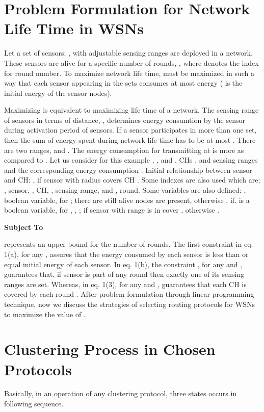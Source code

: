 \documentclass[journal]{IEEEtran}
\begin{document}
{\section{Problem Formulation for Network Life Time in WSNs}
Let a set of sensors; , with adjustable sensing ranges are deployed in a network. These sensors are alive for a specific number of rounds, , where  denotes the index for round number. To maximize network life time,  must be maximized in such a way that each sensor appearing in the sets  consumes at most  energy ( is the initial energy of the sensor nodes).

Maximizing  is equivalent to maximizing life time of a network. The sensing range of sensors in terms of distance, , determines energy consumtion by the sensor during activation period of sensors. If a sensor participates in more than one set, then the sum of energy spent during network life time has to be at most . There are two ranges,  and . The energy consumption for transmitting at  is more as compared to . Let us consider for this example , , and ,  CHs , and  sensing ranges  and the corresponding energy consumption . Initial relationship between sensor and CH: , if sensor  with radius  covers CH . Some indexes are also used which are; ,  sensor, ,  CH, ,  sensing range, and ,  round. Some variables are also defined: , boolean variable, for ;  there are still alive nodes are present, otherwise , if.  is a boolean variable, for , , ;  if sensor  with range  is in cover , otherwise .


\normalsize

\textbf {Subject To}



 represents an upper bound for the number of rounds. The first constraint in eq. 1(a),  for any , assures that the energy consumed by each sensor  is less than or equal initial  energy of each sensor. In eq. 1(b), the constraint , for any  and , guarantees that, if sensor  is part of any round  then exactly one of its  sensing ranges are set. Whereas, in eq. 1(3),  for any  and , guarantees that each CH  is covered by each round . After problem formulation through linear programming technique, now we discuss the strategies of selecting routing protocols for WSNs to maximize the value of .

\section{Clustering Process in Chosen Protocols}
Basically, in an operation of any clustering protocol, three states occurs in following sequence.

}
\end{document}
